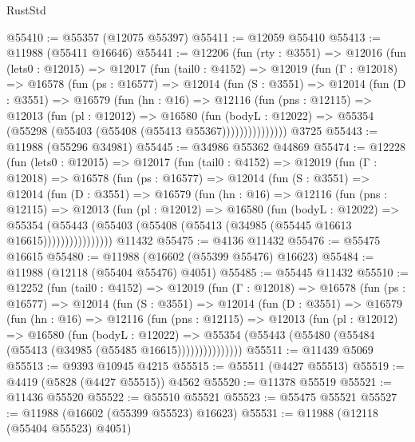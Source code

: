\begin{lexlean}{RustStd}
\begin{coremodule}
@55410 := @55357 (@12075 @55397)
@55411 := @12059 @55410
@55413 := @11988 (@55411 @16646)
@55441 := @12206
    (fun (rty : @3551) =>
    @12016
      (fun (lets0 : @12015) =>
      @12017
        (fun (tail0 : @4152) =>
        @12019
          (fun (Γ : @12018) =>
          @16578
            (fun (ps : @16577) =>
            @12014
              (fun (S : @3551) =>
              @12014
                (fun (D : @3551) =>
                @16579
                  (fun (hn : @16) =>
                  @12116
                    (fun (pns : @12115) =>
                    @12013
                      (fun (pl : @12012) =>
                      @16580
                        (fun (bodyL : @12022) =>
                        @55354 (@55298 (@55403 (@55408 (@55413 @55367)))))))))))))))
    @3725
@55443 := @11988 (@55296 @34981)
@55445 := @34986 @55362 @44869
@55474 := @12228
    (fun (lets0 : @12015) =>
    @12017
      (fun (tail0 : @4152) =>
      @12019
        (fun (Γ : @12018) =>
        @16578
          (fun (ps : @16577) =>
          @12014
            (fun (S : @3551) =>
            @12014
              (fun (D : @3551) =>
              @16579
                (fun (hn : @16) =>
                @12116
                  (fun (pns : @12115) =>
                  @12013
                    (fun (pl : @12012) =>
                    @16580
                      (fun (bodyL : @12022) =>
                      @55354
                        (@55443
                          (@55403 (@55408 (@55413 (@34985 (@55445 @16613 @16615))))))))))))))))
    @11432
@55475 := @4136 @11432
@55476 := @55475 @16615
@55480 := @11988 (@16602 (@55399 @55476) @16623)
@55484 := @11988 (@12118 (@55404 @55476) @4051)
@55485 := @55445 @11432
@55510 := @12252
    (fun (tail0 : @4152) =>
    @12019
      (fun (Γ : @12018) =>
      @16578
        (fun (ps : @16577) =>
        @12014
          (fun (S : @3551) =>
          @12014
            (fun (D : @3551) =>
            @16579
              (fun (hn : @16) =>
              @12116
                (fun (pns : @12115) =>
                @12013
                  (fun (pl : @12012) =>
                  @16580
                    (fun (bodyL : @12022) =>
                    @55354 (@55443 (@55480 (@55484 (@55413 (@34985 (@55485 @16615)))))))))))))))
@55511 := @11439 @5069
@55513 := @9393 @10945 @4215
@55515 := @55511 (@4427 @55513)
@55519 := @4419 (@5828 (@4427 @55515)) @4562
@55520 := @11378 @55519
@55521 := @11436 @55520
@55522 := @55510 @55521
@55523 := @55475 @55521
@55527 := @11988 (@16602 (@55399 @55523) @16623)
@55531 := @11988 (@12118 (@55404 @55523) @4051)

\end{coremodule}
\end{lexlean}
